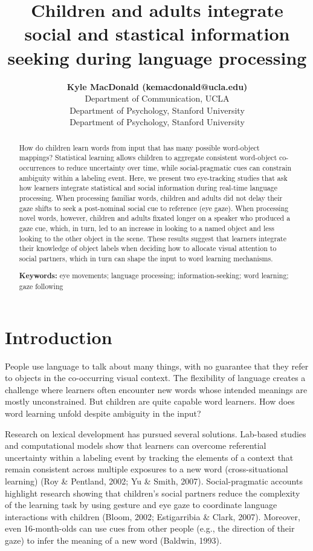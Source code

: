 \documentclass[10pt, letterpaper]{article}
\title{Children and adults integrate social and stastical information seeking
during language processing}
\author{{\large \bf Kyle MacDonald (kemacdonald@ucla.edu)} \\ Department of Communication, UCLA  \AND {\large \bf Elizabeth Swanson (elizswan@stanford.edu)} \\ Department of Psychology, Stanford University  \AND {\large \bf Michael C. Frank (mcfrank@stanford.edu)} \\ Department of Psychology, Stanford University  }
\begin{document}
\maketitle

\begin{abstract}
How do children learn words from input that has many possible
word-object mappings? Statistical learning allows children to aggregate
consistent word-object co-occurrences to reduce uncertainty over time,
while social-pragmatic cues can constrain ambiguity within a labeling
event. Here, we present two eye-tracking studies that ask how learners
integrate statistical and social information during real-time language
processing. When processing familiar words, children and adults did not
delay their gaze shifts to seek a post-nominal social cue to reference
(eye gaze). When processing novel words, however, children and adults
fixated longer on a speaker who produced a gaze cue, which, in turn, led
to an increase in looking to a named object and less looking to the
other object in the scene. These results suggest that learners integrate
their knowledge of object labels when deciding how to allocate visual
attention to social partners, which in turn can shape the input to word
learning mechanisms.

\textbf{Keywords:}
eye movements; language processing; information-seeking; word learning;
gaze following
\end{abstract}

\hypertarget{introduction}{%
\section{Introduction}\label{introduction}}

People use language to talk about many things, with no guarantee that
they refer to objects in the co-occurring visual context. The
flexibility of language creates a challenge where learners often
encounter new words whose intended meanings are mostly unconstrained.
But children are quite capable word learners. How does word learning
unfold despite ambiguity in the input?

Research on lexical development has pursued several solutions. Lab-based
studies and computational models show that learners can overcome
referential uncertainty within a labeling event by tracking the elements
of a context that remain consistent across multiple exposures to a new
word (cross-situational learning) (Roy \& Pentland, 2002; Yu \& Smith,
2007). Social-pragmatic accounts highlight research showing that
children's social partners reduce the complexity of the learning task by
using gesture and eye gaze to coordinate language interactions with
children (Bloom, 2002; Estigarribia \& Clark, 2007). Moreover, even
16-month-olds can use cues from other people (e.g., the direction of
their gaze) to infer the meaning of a new word (Baldwin, 1993).
\end{document}
